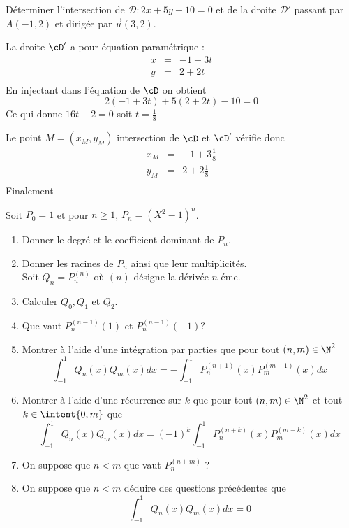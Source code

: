 \documentclass[a4paper, 11pt,reqno]{article}
\begin{document}
\vspace{1cm}
\begin{exercice}  \;
D\'eterminer l'intersection de $\mathcal{D} : 2x+5y-10=0$ et de la droite $\mathcal{D}'$ passant par $A(-1,2)$ et dirig\'ee par $\vec{u}(3,2)$.
\end{exercice}


\begin{correction}
La droite $\cD'$ a pour équation paramétrique :
$$\begin{array}{ccc}
x&=&-1+3t\\
y&=&2+2t\\
\end{array}$$
En injectant dans l'équation de $\cD$ on obtient 
$$2 (-1+3t) +5(2+2t) -10 =0$$
Ce qui donne $16t -2=0$ soit $t=\frac{1}{8}$

Le point $M=(x_M,y_M)$ intersection de $\cD$ et $\cD'$ vérifie donc 
$$\begin{array}{ccc}
x_M&=&-1+3\frac{1}{8}\\
y_M&=&2+2\frac{1}{8}\\
\end{array}$$
Finalement 


\end{correction}
\vspace{1cm}

\begin{exercice}
Soit $P_0=1$ et pour $n\geq 1$,  $P_n =(X^2-1)^n$. 
\begin{enumerate}
\item Donner le degré et le coefficient dominant de $P_n$. 
\item Donner les racines de $P_n$ ainsi que leur multiplicités. \\

Soit $Q_n= P_n^{(n)}$ où $(n)$ désigne la dérivée $n$-éme. 
\item Calculer $Q_0, Q_1$ et $Q_2$. 
\item Que vaut $P_n^{(n-1)} (1)$ et $P_n^{(n-1)} (-1)$?
\item Montrer à l'aide d'une intégration par parties que pour tout $(n,m)\in \N^2$ 
$$\int_{-1}^{1} Q_n(x) Q_m(x)dx = -\int_{-1}^{1} P_n^{(n+1)}(x) P_m^{(m-1)} (x)dx$$
\item Montrer à l'aide d'une récurrence sur $k$ que pour tout $(n,m)\in \N^2$ et tout $k\in\intent{0,m}$ que 
$$\int_{-1}^{1} Q_n(x) Q_m(x)dx = (-1)^k\int_{-1}^{1} P_n^{(n+k)}(x) P_m^{(m-k)} (x)dx$$
\item On suppose que $n<m$ que vaut $P_n^{(n+m)}$ ?
\item On suppose que $n<m$ déduire des questions précédentes que 
$$\int_{-1}^{1} Q_n(x) Q_m(x)dx = 0$$
\end{enumerate}
\end{exercice}
\end{document}
